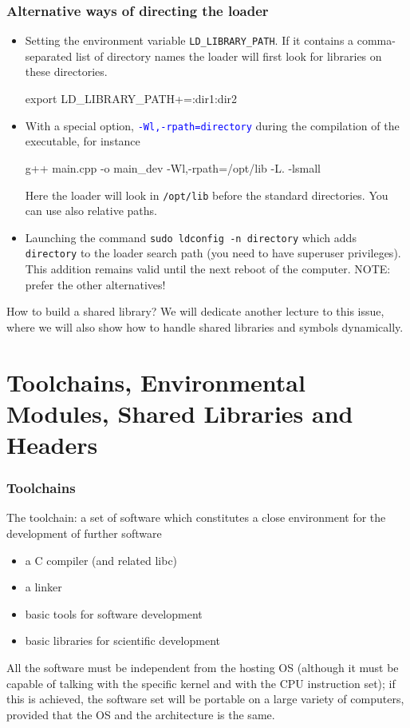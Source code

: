\documentclass[9pt]{beamer}
\begin{document}
\begin{frame}
\frametitle{Alternative ways of directing the loader}
\begin{itemize}
\item Setting the environment variable \texttt{LD\_LIBRARY\_PATH}. If
  it contains a comma-separated list of directory names the
  loader will first look for libraries on these directories.
  \begin{semiverbatim}
    export LD\_LIBRARY\_PATH+=:\alert{dir1}:\alert{dir2}
  \end{semiverbatim}
  \item With a special option, \textcolor{blue}{\texttt{-Wl,-rpath=\alert{directory}}}
 during the compilation of the executable, for instance
   \begin{semiverbatim}
     g++ main.cpp -o main\_dev -Wl,-rpath=/opt/lib  -L. -lsmall
  \end{semiverbatim}
 Here the loader will look in \texttt{/opt/lib} before the standard directories. You can use also relative paths.
\item Launching the command \texttt{sudo ldconfig -n \alert{directory}} which adds \texttt{directory} to the loader search path (you need to have superuser privileges). This addition remains valid until the next reboot of the computer. \alert{NOTE: prefer the other alternatives!}

\end{itemize}
\end{frame}
\begin{frame}{How to build a shared library?}
We will dedicate another lecture to this issue, where we will also show how to handle shared libraries and symbols dynamically.
\end{frame}

\section{Toolchains, Environmental Modules, Shared Libraries and Headers}

\begin{frame}
\frametitle{Toolchains}
The toolchain: a set of software which constitutes a close environment for the development of further software

\begin{itemize}
\item 	a C compiler (and related libc)
\item 	a linker
\item basic tools for software development
\item 	basic libraries for scientific development
\end{itemize}	

All the software must be independent from the hosting OS 
(although it must be capable of talking with the specific kernel and with the CPU instruction set); if this is achieved, the software set will be portable on a large variety of computers, provided that the OS and the architecture is the same.

\end{frame}
\end{document}
